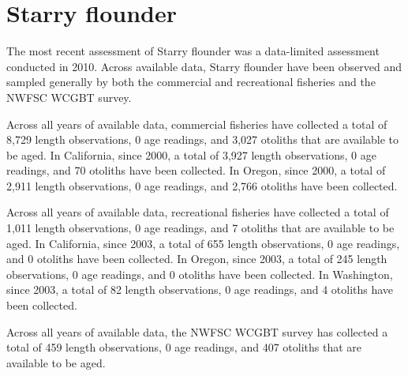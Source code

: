 \documentclass[11pt,
  english,
  letterpaper,
]{article}
\begin{document}

\hypertarget{starry-flounder}{%
\section{Starry flounder}\label{starry-flounder}}

\leavevmode\tagmcend\tagstructend


The most recent assessment of Starry flounder was a data-limited assessment conducted in 2010. Across available data, Starry flounder have been observed and sampled generally by both the commercial and recreational fisheries and the NWFSC WCGBT survey.

\leavevmode\tagmcend\tagstructend\par


Across all years of available data, commercial fisheries have collected a total of 8,729 length observations, 0 age readings, and 3,027 otoliths that are available to be aged. In California, since 2000, a total of 3,927 length observations, 0 age readings, and 70 otoliths have been collected. In Oregon, since 2000, a total of 2,911 length observations, 0 age readings, and 2,766 otoliths have been collected.

\leavevmode\tagmcend\tagstructend\par


Across all years of available data, recreational fisheries have collected a total of 1,011 length observations, 0 age readings, and 7 otoliths that are available to be aged. In California, since 2003, a total of 655 length observations, 0 age readings, and 0 otoliths have been collected. In Oregon, since 2003, a total of 245 length observations, 0 age readings, and 0 otoliths have been collected. In Washington, since 2003, a total of 82 length observations, 0 age readings, and 4 otoliths have been collected.

\leavevmode\tagmcend\tagstructend\par


Across all years of available data, the NWFSC WCGBT survey has collected a total of 459 length observations, 0 age readings, and 407 otoliths that are available to be aged.
\end{document}
